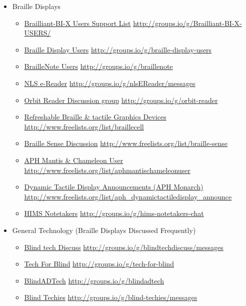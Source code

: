 \begin{itemize}[leftmargin=*]
\item Braille Displays
\begin{itemize}[leftmargin=2em]
\item \href{http://groups.io/g/Brailliant-BI-X-USERS/}{Brailliant-BI-X Users Support List}  \break\url{http://groups.io/g/Brailliant-BI-X-USERS/} 
\item \href{http://groups.io/g/braille-display-users}{Braille Display Users}  \break\url{http://groups.io/g/braille-display-users}
\item \href{http://groups.io/g/braillenote}{BrailleNote Users}  \break\url{http://groups.io/g/braillenote}
\item \href{http://groups.io/g/nlsEReader/messages}{NLS e-Reader}  \break\url{http://groups.io/g/nlsEReader/messages}
\item \href{http://groups.io/g/orbit-reader}{Orbit Reader Discussion group}  \break\url{http://groups.io/g/orbit-reader}
\item \href{http://www.freelists.org/list/braillecell}{Refreshable Braille \& tactile Graphics Devices}  \break\url{http://www.freelists.org/list/braillecell}
\item \href{http://www.freelists.org/list/braille-sense}{Braille Sense Discussion}  \break\url{http://www.freelists.org/list/braille-sense}
\item \href{http://www.freelists.org/list/aphmantischameleonuser}{APH Mantis \& Chameleon User}  \break\url{http://www.freelists.org/list/aphmantischameleonuser}
\item \href{http://www.freelists.org/list/aph_dynamictactiledisplay_announce}{Dynamic Tactile Display Announcements (APH Monarch)}  \break\url{http://www.freelists.org/list/aph_dynamictactiledisplay_announce}
\item \href{http://groups.io/g/hims-notetakers-chat}{HIMS Notetakers}  \break\url{http://groups.io/g/hims-notetakers-chat}
\end{itemize}
\item General Technology (Braille Displays Discussed Frequently)
\begin{itemize}[leftmargin=2em]
\item \href{http://groups.io/g/blindtechdiscuss/messages}{Blind tech Discuss}  \break\url{http://groups.io/g/blindtechdiscuss/messages}
\item \href{http://groups.io/g/tech-for-blind}{Tech For Blind}  \break\url{http://groups.io/g/tech-for-blind}
\item \href{http://groups.io/g/blindadtech}{BlindADTech}  \break\url{http://groups.io/g/blindadtech}
\item \href{http://groups.io/g/blind-techies/messages}{Blind Techies}  \break\url{http://groups.io/g/blind-techies/messages}
\end{itemize}
\end{itemize}
